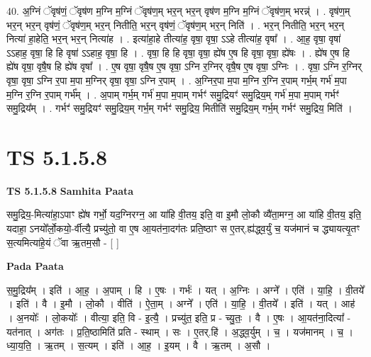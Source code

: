 \documentclass[17pt]{extarticle}
\begin{document}
40. अ॒ग्निं ॅवृष॑णं॒ ॅवृष॑ण म॒ग्नि म॒ग्निं ॅवृष॑ण॒म् भर॒न् भर॒न् वृष॑ण म॒ग्नि म॒ग्निं ॅवृष॑ण॒म् भरन्न्॑ । . वृष॑ण॒म् भर॒न् भर॒न् वृष॑णं॒ ॅवृष॑ण॒म् भर॒न् नितीति॒ भर॒न् वृष॑णं॒ ॅवृष॑ण॒म् भर॒न् निति॑ । . भर॒न् नितीति॒ भर॒न् भर॒न् नित्या॑ हा॒हेति॒ भर॒न् भर॒न् नित्या॑ह । . इत्या॑हा॒हे तीत्या॑ह॒ वृषा॒ वृषा॒ ऽऽहे तीत्या॑ह॒ वृषा᳚ । . आ॒ह॒ वृषा॒ वृषा॑ ऽऽहाह॒ वृषा॒ हि हि वृषा॑ ऽऽहाह॒ वृषा॒ हि । . वृषा॒ हि हि वृषा॒ वृषा॒ ह्ये॑ष ए॒ष हि वृषा॒ वृषा॒ ह्ये॑षः । . ह्ये॑ष ए॒ष हि ह्ये॑ष वृषा॒ वृषै॒ष हि ह्ये॑ष वृषा᳚ । . ए॒ष वृषा॒ वृषै॒ष ए॒ष वृषा॒ ऽग्नि र॒ग्निर् वृषै॒ष ए॒ष वृषा॒ ऽग्निः । . वृषा॒ ऽग्नि र॒ग्निर् वृषा॒ वृषा॒ ऽग्नि र॒पा म॒पा म॒ग्निर् वृषा॒ वृषा॒ ऽग्नि र॒पाम् । . अ॒ग्निर॒पा म॒पा म॒ग्नि र॒ग्नि र॒पाम् गर्भ॒म् गर्भ॑ म॒पा म॒ग्नि र॒ग्नि र॒पाम् गर्भ᳚म् । . अ॒पाम् गर्भ॒म् गर्भ॑ म॒पा म॒पाम् गर्भꣳ॑ समु॒द्रियꣳ॑ समु॒द्रिय॒म् गर्भ॑ म॒पा म॒पाम् गर्भꣳ॑ समु॒द्रिय᳚म् । . गर्भꣳ॑ समु॒द्रियꣳ॑ समु॒द्रिय॒म् गर्भ॒म् गर्भꣳ॑ समु॒द्रिय॒ मितीति॑ समु॒द्रिय॒म् गर्भ॒म् गर्भꣳ॑ समु॒द्रिय॒ मिति॑ । \newline
\pagebreak
{}

\section{ TS 5.1.5.8 }

\textbf{TS 5.1.5.8 } \newline
\textbf{Samhita Paata} \newline

समु॒द्रिय॒-मित्या॑हा॒ऽपाꣳ ह्ये॑ष गर्भो॒ यद॒ग्निरग्न॒ आ या॑हि वी॒तय॒ इति॒ वा इ॒मौ लो॒कौ व्यै॑ता॒मग्न॒ आ या॑हि वी॒तय॒ इति॒ यदाहा॒ ऽनयो᳚र्लो॒कयो॒-र्वीत्यै॒ प्रच्यु॑तो॒ वा ए॒ष आ॒यत॑ना॒दग॑तः प्रति॒ष्ठाꣳ स ए॒तर्.ह्य॑द्ध्व॒र्युं च॒ यज॑मानं च द्ध्यायत्यृ॒तꣳ स॒त्यमित्या॑हे॒यं ॅवा ऋ॒तम॒सौ - [  ] \newline

\textbf{Pada Paata} \newline

स॒मु॒द्रिय᳚म् । इति॑ । आ॒ह॒ । अ॒पाम् । हि । ए॒षः । गर्भः॑ । यत् । अ॒ग्निः । अग्ने᳚ । एति॑ । या॒हि॒ । वी॒तये᳚ । इति॑ । वै । इ॒मौ । लो॒कौ । वीति॑ । ऐ॒ता॒म् । अग्ने᳚ । एति॑ । या॒हि॒ । वी॒तये᳚ । इति॑ । यत् । आह॑ । अ॒नयोः᳚ । लो॒कयोः᳚ । वीत्या॒ इति॒ वि - इ॒त्यै॒ । प्रच्यु॑त॒ इति॒ प्र - च्यु॒तः॒ । वै । ए॒षः । आ॒यत॑ना॒दित्या᳚ - यत॑नात् । अग॑तः । प्र॒ति॒ष्ठामिति॑ प्रति - स्थाम् । सः । ए॒तर्.हि॑ । अ॒द्ध्व॒र्युम् । च॒ । यज॑मानम् । च॒ । ध्या॒य॒ति॒ । ऋ॒तम् । स॒त्यम् । इति॑ । आ॒ह॒ । इ॒यम् । वै । ऋ॒तम् । अ॒सौ ।  \newline
\end{document}
